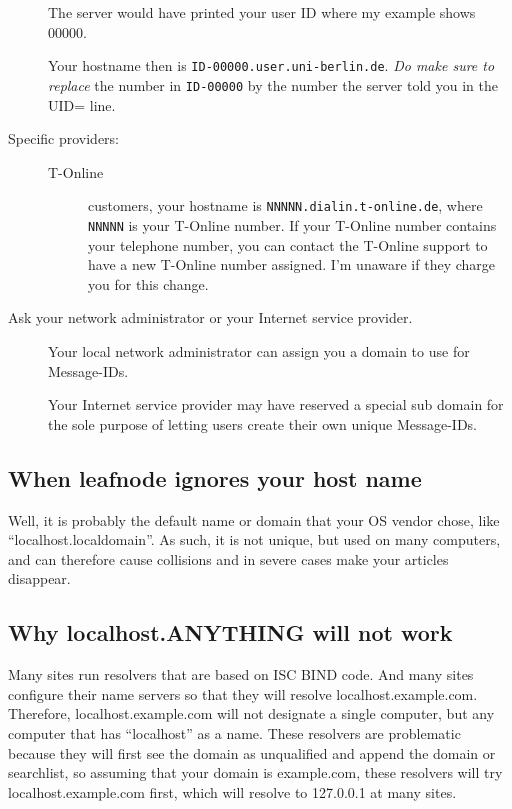 \documentclass[10pt,english,a5paper]{article}
\begin{document}
\begin{description}
The server would have printed your user ID where my example shows 00000.

Your hostname then is \verb+ID-00000.user.uni-berlin.de+. \textit{Do make sure to
replace} the number in \verb+ID-00000+ by the number the server told you in the
UID= line.

\item[Specific providers:] \begin{description}

\item[{T-Online}] customers, your hostname is
    \verb+NNNNN.dialin.t-online.de+, where
\verb+NNNNN+ is your T-Online number. If your T-Online number contains your
telephone number, you can contact the T-Online support to have a new
T-Online number assigned. I'm unaware if they charge you for this
change.

\end{description}

\item[Ask your network administrator or your Internet service provider.]

Your local network administrator can assign you a domain to use for
Message-IDs.

Your Internet service provider may have reserved a special sub domain for
the sole purpose of letting users create their own unique Message-IDs.

\end{description}

\subsection{When leafnode ignores your host name}

Well, it is probably the default name or domain that your OS vendor
chose, like ``localhost.localdomain''. As such, it is not unique, but used
on many computers, and can therefore cause collisions and in severe
cases make your articles disappear.

\subsection{Why localhost.ANYTHING will not work}

Many sites run resolvers that are based on ISC BIND code. And many sites
configure their name servers so that they will resolve localhost.example.com.
Therefore, localhost.example.com will not designate a single computer,
but any computer that has ``localhost'' as a name. These resolvers are
problematic because they will first see the domain as unqualified and
append the domain or searchlist, so assuming that your domain is
example.com, these resolvers will try localhost.example.com first, which
will resolve to 127.0.0.1 at many sites.
\end{document}
